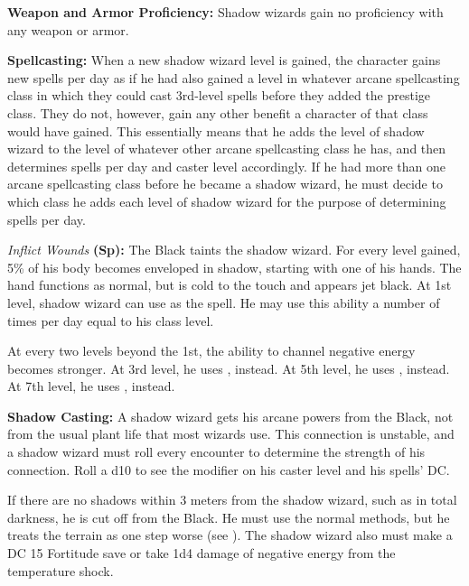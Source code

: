 {
\textbf{Weapon and Armor Proficiency:} Shadow wizards gain no proficiency with any weapon or armor.

\textbf{Spellcasting:} When a new shadow wizard level is gained, the character gains new spells per day as if he had also gained a level in whatever arcane spellcasting class in which they could cast 3rd-level spells before they added the prestige class. They do not, however, gain any other benefit a character of that class would have gained. This essentially means that he adds the level of shadow wizard to the level of whatever other arcane spellcasting class he has, and then determines spells per day and caster level accordingly. If he had more than one arcane spellcasting class before he became a shadow wizard, he must decide to which class he adds each level of shadow wizard for the purpose of determining spells per day.

\textit{Inflict Wounds} \textbf{(Sp):} The Black taints the shadow wizard. For every level gained, 5\% of his body becomes enveloped in shadow, starting with one of his hands. The hand functions as normal, but is cold to the touch and appears jet black. At 1st level, shadow wizard can use  as the spell. He may use this ability a number of times per day equal to his class level.

At every two levels beyond the 1st, the ability to channel negative energy becomes stronger. At 3rd level, he uses , instead. At 5th level, he uses , instead. At 7th level, he uses , instead.

\textbf{Shadow Casting:} A shadow wizard gets his arcane powers from the Black, not from the usual plant life that most wizards use. This connection is unstable, and a shadow wizard must roll every encounter to determine the strength of his connection. Roll a d10 to see the modifier on his caster level and his spells' DC.


If there are no shadows within 3 meters from the shadow wizard, such as in total darkness, he is cut off from the Black. He must use the normal methods, but he treats the terrain as one step worse (see ). The shadow wizard also must make a DC 15 Fortitude save or take 1d4 damage of negative energy from the temperature shock.

}

